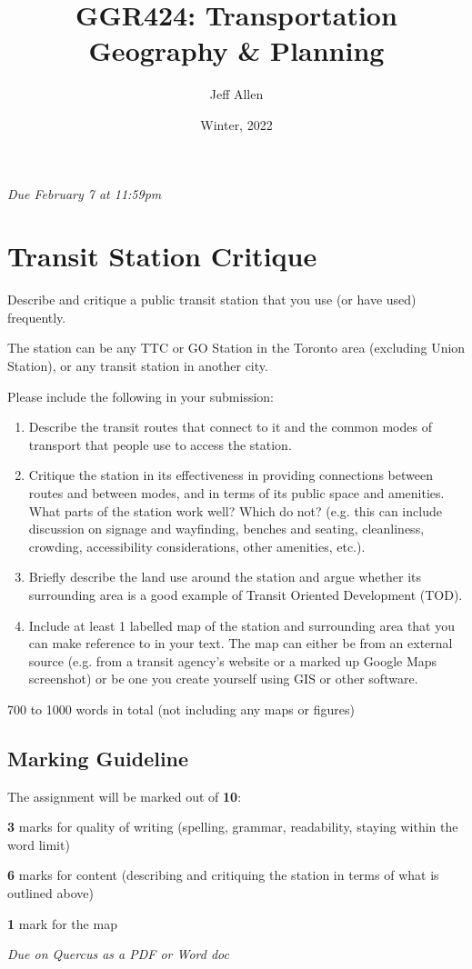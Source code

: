 \documentclass[11pt]{article}
\title{\textbf{GGR424: Transportation Geography \& Planning}}
\author{Jeff Allen}
\date{Winter, 2022}
\begin{document}
	\allsectionsfont{\sffamily}
		
	\textit{Due February 7 at 11:59pm}
		
	\section*{Transit Station Critique}
	
	Describe and critique a public transit station that you use (or have used) frequently. 
	
	The station can be any TTC or GO Station in the Toronto area (excluding Union Station), or any transit station in another city.
	
	Please include the following in your submission:
	
	\begin{enumerate}
		\item Describe the transit routes that connect to it and the common modes of transport that people use to access	the station.
		\item Critique the station in its effectiveness in providing connections between routes and between modes, and in terms of its public space and amenities. What parts of the station work well? Which do not? (e.g. this can include discussion on signage and wayfinding,	benches and seating, cleanliness, crowding, accessibility considerations, other amenities, etc.).
		\item Briefly describe the land use around the station and argue whether its surrounding area is a good example of Transit Oriented Development (TOD).
		\item Include at least 1 labelled map of the station and surrounding area that you can make reference to in your text. The map can either be from an external source (e.g. from a transit agency's website or a marked up Google Maps screenshot) or be one you create yourself using GIS or other software.
	\end{enumerate}
	
	700 to 1000 words in total (not including any maps or figures)

	
	\subsection*{Marking Guideline}
	
	The assignment will be marked out of \textbf{10}:
	
	\textbf{3} marks for quality of writing (spelling, grammar, readability, staying within the word limit)
	
	\textbf{6} marks for content (describing and critiquing the station in terms of what is outlined above)
	
	\textbf{1} mark for the map
	
	\textit{Due on Quercus as a PDF or Word doc}
	
\end{document}
